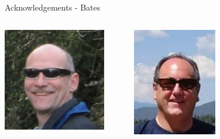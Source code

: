 \documentclass[aspectratio=169]{beamer}
\begin{document}
\begin{frame}{Acknowledgements - Bates}
    \begin{columns}
        \centering
        \centering
            
            \includegraphics[width=0.85\textwidth]{people/bates/jim.png}
            
        \centering
                
            \includegraphics[width=0.85\textwidth]{people/bates/ernie.png}
        \centering
            

\end{columns}
\end{frame}
\end{document}
